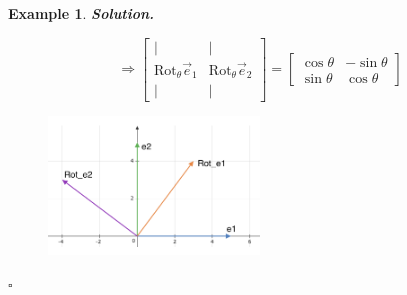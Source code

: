 \documentclass[12pt, a4paper]{article}
\newtheorem{eg}{Example}[subsection]
\newenvironment*{sol}{\indent\textbf{Solution. }}{\hfill{$\square$}\par}
\def\vece{\vec{e}}
\begin{document}
\begin{eg}
\begin{sol}
\begin{enumerate}
$$\Longrightarrow\begin{bmatrix}|&|\\ \text{Rot}_{\theta}\vece_1& \text{Rot}_{\theta}\vece_2\\|&|\end{bmatrix}=\begin{bmatrix}\cos{\theta}&-\sin{\theta}\\\sin{\theta}&\cos{\theta}\end{bmatrix}$$
\begin{figure}[H] 
\centering 
\includegraphics[width=0.5\textwidth]{Rotation.png}
\end{figure}
\end{enumerate}
\end{sol}
\end{eg}
\end{document}
